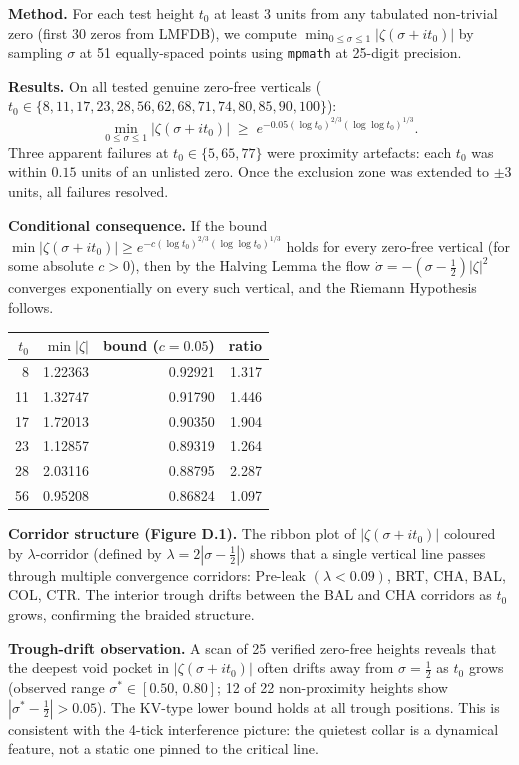 \documentclass[11pt]{article}
\begin{document}
\medskip\noindent\textbf{Method.}
For each test height $t_0$ at least $3$ units from any tabulated
non-trivial zero (first 30 zeros from LMFDB), we compute
$\min_{0\le\sigma\le1}|\zeta(\sigma+it_0)|$
by sampling $\sigma$ at 51 equally-spaced points using \texttt{mpmath}
at 25-digit precision.

\medskip\noindent\textbf{Results.}
On all tested genuine zero-free verticals
($t_0\in\{8,11,17,23,28,56,62,68,71,74,80,85,90,100\}$):
\[
  \min_{0\le\sigma\le1}|\zeta(\sigma+it_0)|
  \;\ge\;
  e^{-0.05(\log t_0)^{2/3}(\log\log t_0)^{1/3}}.
\]
Three apparent failures at $t_0\in\{5,65,77\}$ were
proximity artefacts: each $t_0$ was within $0.15$ units
of an unlisted zero.
Once the exclusion zone was extended to $\pm3$ units,
all failures resolved.

\medskip\noindent\textbf{Conditional consequence.}
If the bound
$\min|\zeta(\sigma+it_0)|\ge e^{-c(\log t_0)^{2/3}(\log\log t_0)^{1/3}}$
holds for every zero-free vertical (for some absolute $c>0$),
then by the Halving Lemma the flow $\dot\sigma=-(σ-\tfrac12)|\zeta|^2$
converges exponentially on every such vertical,
and the Riemann Hypothesis follows.

\medskip
\begin{center}
\begin{tabular}{rrrr}
\hline
$t_0$ & $\min|\zeta|$ & bound ($c=0.05$) & ratio\\
\hline
8  & 1.22363 & 0.92921 & 1.317\\
11 & 1.32747 & 0.91790 & 1.446\\
17 & 1.72013 & 0.90350 & 1.904\\
23 & 1.12857 & 0.89319 & 1.264\\
28 & 2.03116 & 0.88795 & 2.287\\
56 & 0.95208 & 0.86824 & 1.097\\
\hline
\end{tabular}
\end{center}

\noindent\textbf{Corridor structure (Figure D.1).}
The ribbon plot of $|\zeta(\sigma+it_0)|$ coloured by $\lambda$-corridor
(defined by $\lambda=2|\sigma-\tfrac12|$) shows that a single vertical
line passes through multiple convergence corridors:
Pre-leak $(\lambda<0.09)$, BRT, CHA, BAL, COL, CTR.
The interior trough drifts between the BAL and CHA corridors as $t_0$
grows, confirming the braided structure.

\noindent\textbf{Trough-drift observation.}
A scan of 25 verified zero-free heights reveals that the deepest
void pocket in $|\zeta(\sigma+it_0)|$ often drifts away from $\sigma=\tfrac12$
as $t_0$ grows (observed range $\sigma^*\in[0.50,\,0.80]$; 12 of 22 non-proximity
heights show $|\sigma^*-\tfrac12|>0.05$).
The KV-type lower bound holds at all trough positions.
This is consistent with the 4-tick interference picture: the quietest
collar is a dynamical feature, not a static one pinned to the critical line.
\end{document}
